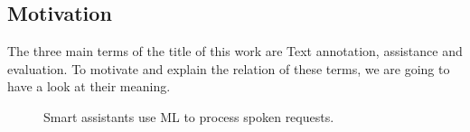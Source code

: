 \subsection{Motivation}
	The three main terms of the title of this work are Text annotation, assistance and evaluation. To motivate and explain the relation of these terms, we are going to have a look at their meaning.

	\begin{figure}[h]
		\centering
		\qquad
		\qquad
		\qquad
		\qquad
		\caption{Smart assistants use \ac{ML} to process spoken requests.}%
		\label{fig:exampleHomeAssistants}%
	\end{figure}

